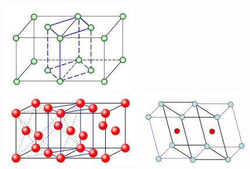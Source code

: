     \begin{figure}[!htbp]
        \centering
        \begin{minipage}[t]{0.3\linewidth}
            \includegraphics[width=1\linewidth, keepaspectratio=true]{pic/1-19}
        \end{minipage}
        \hfill
        \begin{minipage}[t]{0.3\linewidth}
            \includegraphics[width=1\linewidth, keepaspectratio=true]{pic/1-20}
        \end{minipage}
        \hfill
        \begin{minipage}[t]{0.3\linewidth}
            \includegraphics[width=1\linewidth, keepaspectratio=true]{pic/1-21}

\end{minipage}
\end{figure}
